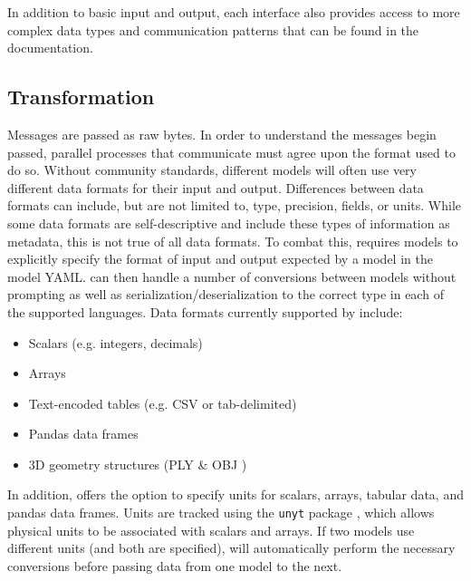 \documentclass[journal]{IEEEtran}
\newcommand{\todo}[1]{{\color{red}{#1}}}
\newcommand{\pkg}{{\tt \todo{cis\_interface}}{}}
\newcommand{\A}{Appendix{ }}
\begin{document}
In addition to basic input and output, each interface also provides access to more complex data types and communication patterns that can be found in the {\pkg} documentation. 


%
\subsection{Transformation}\label{SS:transformation}
%
%
Messages are passed as raw bytes. In order to understand the messages begin passed, parallel processes that communicate must agree upon the format used to do so. Without community standards, different models will often use very different data formats for their input and output. Differences between data formats can include, but are not limited to, type, precision, fields, or units. While some data formats are self-descriptive and include these types of information as metadata, this is not true of all data formats. To combat this, {\pkg} requires models to explicitly specify the format of input and output expected by a model in the model YAML. {\pkg} can then handle a number of conversions between models without prompting as well as serialization/deserialization to the correct type in each of the supported languages. Data formats currently supported by {\pkg} include:
%
\begin{itemize}
	\item Scalars (e.g. integers, decimals)
	\item Arrays
	\item Text-encoded tables (e.g. CSV or tab-delimited)
	\item Pandas data frames \citep{pandas}
	\item 3D geometry structures (PLY \citep{ply} \& OBJ \citep{obj})
\end{itemize}

%
In addition, {\pkg} offers the option to specify units for scalars, arrays, tabular data, and pandas data frames. Units are tracked using the {\tt unyt} package \citep{Goldbaum2018}, which allows physical units to be associated with scalars and arrays. If two models use different units (and both are specified), {\pkg} will automatically perform the necessary conversions before passing data from one model to the next.
\end{document}
